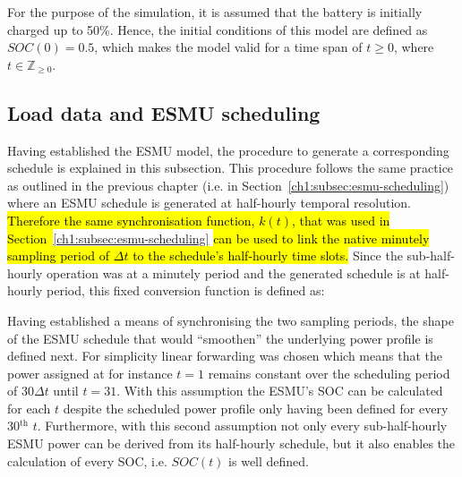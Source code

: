 For the purpose of the simulation, it is assumed that the battery is initially charged up to 50\%.
Hence, the initial conditions of this model are defined as $SOC(0) = 0.5$, which makes the model valid for a time span of $t \geq 0$, where $t \in \mathbb{Z}_{\geq0}$.

\subsection{Load data and ESMU scheduling}
\label{ch2:subsec:load-data-and-esmu-scheduling}


Having established the ESMU model, the procedure to generate a corresponding schedule is explained in this subsection.
This procedure follows the same practice as outlined in the previous chapter (i.e. in Section~\ref{ch1:subsec:esmu-scheduling}) where an ESMU schedule is generated at half-hourly temporal resolution.
\hl{Therefore the same synchronisation function, $k(t)$, that was used in Section~}\ref{ch1:subsec:esmu-scheduling}\hl{ can be used to link the native minutely sampling period of $\Delta t$ to the schedule's half-hourly time slots.}
Since the sub-half-hourly operation was at a minutely period and the generated schedule is at half-hourly period, this fixed conversion function is defined as:



Having established a means of synchronising the two sampling periods, the shape of the ESMU schedule that would ``smoothen'' the underlying power profile is defined next.
For simplicity linear forwarding was chosen which means that the power assigned at for instance $t=1$ remains constant over the scheduling period of $30\Delta t$ until $t=31$.
With this assumption the ESMU's SOC can be calculated for each $t$ despite the scheduled power profile only having been defined for every 30$^\text{th}$ $t$.
Furthermore, with this second assumption not only every sub-half-hourly ESMU power can be derived from its half-hourly schedule, but it also enables the calculation of every SOC, i.e. $SOC(t)$ is well defined.


